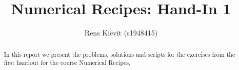 \documentclass[a4paper,10pt]{article}
\title{Numerical Recipes: Hand-In 1}
\author{Rens Kievit (s1948415)}
\begin{document}
\maketitle

\begin{abstract}
    In this report we present the problems, solutions and scripts for the exercises from the first handout for the course
    Numerical Recipes,
\end{abstract}
\end{document}
